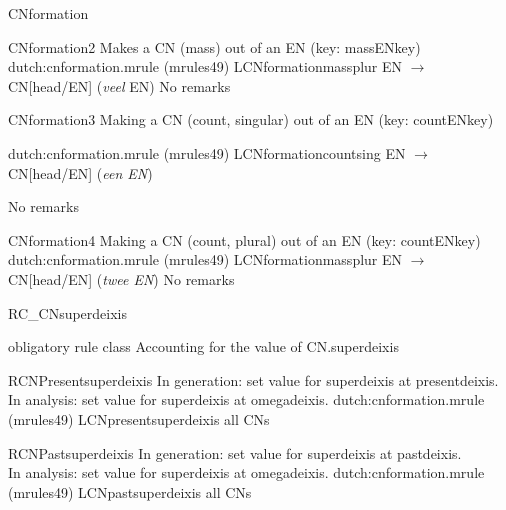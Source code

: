 \begin{mruleclass}{CNformation}
\begin{members}
\begin{member}
\end{member}
\begin{member}
 CNformation2
Makes a CN (mass) out of an EN (key: massENkey)
\file dutch:cnformation.mrule (mrules49)
\semantics LCNformationmassplur
\example EN $\rightarrow$ CN[head/EN] ({\em veel} EN)
\remarks No remarks
\end{member}
\begin{member}
 CNformation3
 Making a CN (count, singular) out of an EN (key: countENkey)

\file dutch:cnformation.mrule (mrules49)
\semantics LCNformationcountsing
\example EN $\rightarrow$ CN[head/EN] ({\em een EN})

\remarks No remarks
\end{member}
\begin{member}
 CNformation4
 Making a CN (count, plural) out of an EN (key: countENkey)
\file dutch:cnformation.mrule (mrules49)
\semantics LCNformationmassplur
\example EN $\rightarrow$ CN[head/EN] ({\em  twee EN})
\remarks No remarks

\end{member}
\end{members}
\end{mruleclass}

\begin{mruleclass}{RC\_CNsuperdeixis}
\begin{classdescr}
\kind obligatory rule class
\classtask Accounting for the value of CN.superdeixis
\classremarks

\nofilters
\nospeedrules
\noplannedrules
\norulesnotince
\begin{comments}
\end{comments}

\end{classdescr}

\begin{members}


\begin{member}
 RCNPresentsuperdeixis
 In generation: set value for superdeixis at presentdeixis.\\
               In analysis: set value for superdeixis at omegadeixis.    
\file dutch:cnformation.mrule (mrules49)
\semantics LCNpresentsuperdeixis
\example all CNs
\end{member}
\begin{member}
 RCNPastsuperdeixis
 In generation: set value for superdeixis at pastdeixis.\\
               In analysis: set value for superdeixis at omegadeixis.    
\file dutch:cnformation.mrule (mrules49)
\semantics LCNpastsuperdeixis
\example all CNs

\end{member}
\end{members}
\end{mruleclass}


